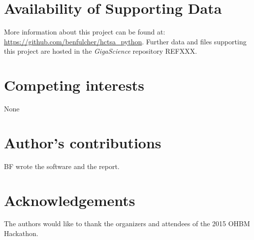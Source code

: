\documentclass[twocolumn]{bmcart}%
\begin{document}
\begin{backmatter}

\section*{Availability of Supporting Data}
More information about this project can be found at: \url{https://github.com/benfulcher/hctsa\_python}. Further data and files supporting this project are hosted in the \emph{GigaScience} repository REFXXX.

\section*{Competing interests}
None

\section*{Author's contributions}
BF wrote the software and the report.

\section*{Acknowledgements}
The authors would like to thank the organizers and attendees of the 2015
OHBM Hackathon.

  
  


\end{backmatter}
\end{document}

